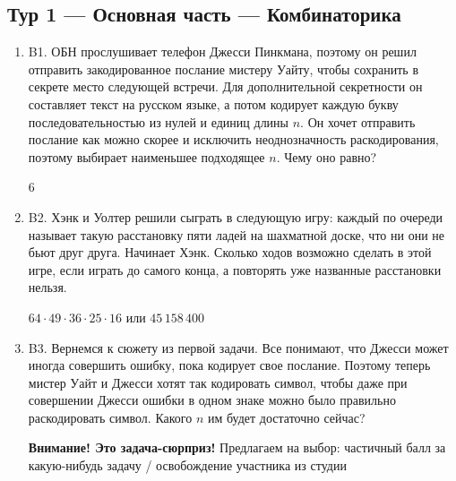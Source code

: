 \documentclass[12pt]{article}
\newenvironment{problem}{}{}
\newenvironment{sol}{}{} %
\begin{document}
\newpage
\subsection{Тур 1 — Основная часть — Комбинаторика}

\begin{enumerate}

\begin{problem}
\item[B1.] ОБН прослушивает телефон Джесси Пинкмана, поэтому он решил отправить закодированное послание мистеру Уайту, чтобы сохранить в секрете место следующей встречи. Для дополнительной секретности он составляет текст на русском языке, а потом кодирует каждую букву последовательностью из нулей и единиц длины $n$. Он хочет отправить послание как можно скорее и исключить неоднозначность раскодирования, поэтому выбирает наименьшее подходящее $n$. Чему оно равно?

\begin{sol}
$6$
\end{sol}
\end{problem}

\begin{problem}
\item[B2.] Хэнк и Уолтер решили сыграть в следующую игру: каждый по очереди называет такую расстановку пяти ладей на шахматной доске, что ни они не бьют друг друга. Начинает Хэнк. Сколько ходов возможно сделать в этой игре, если играть до самого конца, а повторять уже названные расстановки нельзя.

\begin{sol}
$64 \cdot 49 \cdot 36 \cdot25 \cdot 16$ или $45\,158\,400$
\end{sol}
\end{problem}

\begin{problem}
\item[B3.] Вернемся к сюжету из первой задачи. Все понимают, что Джесси может иногда совершить ошибку, пока кодирует свое послание. Поэтому теперь мистер Уайт и Джесси хотят так кодировать символ, чтобы даже при совершении Джесси ошибки в одном знаке можно было правильно раскодировать символ. Какого $n$ им будет достаточно сейчас? 

\begin{sol}
\textbf{Внимание! Это задача-сюрприз!} Предлагаем на выбор: частичный балл за какую-нибудь задачу / освобождение участника из студии


\end{sol}
\end{problem}
\end{enumerate}
\end{document}
